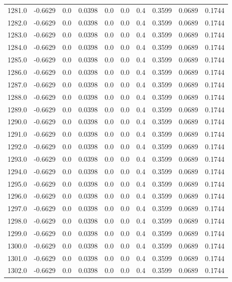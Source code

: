 \begin{longtable}{lrrrrrrrrr}
1281.0 & -0.6629 & 0.0 & 0.0398 & 0.0 & 0.0 & 0.4 & 0.3599 & 0.0689 & 0.1744 \\
1282.0 & -0.6629 & 0.0 & 0.0398 & 0.0 & 0.0 & 0.4 & 0.3599 & 0.0689 & 0.1744 \\
1283.0 & -0.6629 & 0.0 & 0.0398 & 0.0 & 0.0 & 0.4 & 0.3599 & 0.0689 & 0.1744 \\
1284.0 & -0.6629 & 0.0 & 0.0398 & 0.0 & 0.0 & 0.4 & 0.3599 & 0.0689 & 0.1744 \\
1285.0 & -0.6629 & 0.0 & 0.0398 & 0.0 & 0.0 & 0.4 & 0.3599 & 0.0689 & 0.1744 \\
1286.0 & -0.6629 & 0.0 & 0.0398 & 0.0 & 0.0 & 0.4 & 0.3599 & 0.0689 & 0.1744 \\
1287.0 & -0.6629 & 0.0 & 0.0398 & 0.0 & 0.0 & 0.4 & 0.3599 & 0.0689 & 0.1744 \\
1288.0 & -0.6629 & 0.0 & 0.0398 & 0.0 & 0.0 & 0.4 & 0.3599 & 0.0689 & 0.1744 \\
1289.0 & -0.6629 & 0.0 & 0.0398 & 0.0 & 0.0 & 0.4 & 0.3599 & 0.0689 & 0.1744 \\
1290.0 & -0.6629 & 0.0 & 0.0398 & 0.0 & 0.0 & 0.4 & 0.3599 & 0.0689 & 0.1744 \\
1291.0 & -0.6629 & 0.0 & 0.0398 & 0.0 & 0.0 & 0.4 & 0.3599 & 0.0689 & 0.1744 \\
1292.0 & -0.6629 & 0.0 & 0.0398 & 0.0 & 0.0 & 0.4 & 0.3599 & 0.0689 & 0.1744 \\
1293.0 & -0.6629 & 0.0 & 0.0398 & 0.0 & 0.0 & 0.4 & 0.3599 & 0.0689 & 0.1744 \\
1294.0 & -0.6629 & 0.0 & 0.0398 & 0.0 & 0.0 & 0.4 & 0.3599 & 0.0689 & 0.1744 \\
1295.0 & -0.6629 & 0.0 & 0.0398 & 0.0 & 0.0 & 0.4 & 0.3599 & 0.0689 & 0.1744 \\
1296.0 & -0.6629 & 0.0 & 0.0398 & 0.0 & 0.0 & 0.4 & 0.3599 & 0.0689 & 0.1744 \\
1297.0 & -0.6629 & 0.0 & 0.0398 & 0.0 & 0.0 & 0.4 & 0.3599 & 0.0689 & 0.1744 \\
1298.0 & -0.6629 & 0.0 & 0.0398 & 0.0 & 0.0 & 0.4 & 0.3599 & 0.0689 & 0.1744 \\
1299.0 & -0.6629 & 0.0 & 0.0398 & 0.0 & 0.0 & 0.4 & 0.3599 & 0.0689 & 0.1744 \\
1300.0 & -0.6629 & 0.0 & 0.0398 & 0.0 & 0.0 & 0.4 & 0.3599 & 0.0689 & 0.1744 \\
1301.0 & -0.6629 & 0.0 & 0.0398 & 0.0 & 0.0 & 0.4 & 0.3599 & 0.0689 & 0.1744 \\
1302.0 & -0.6629 & 0.0 & 0.0398 & 0.0 & 0.0 & 0.4 & 0.3599 & 0.0689 & 0.1744 \\

\end{longtable}
